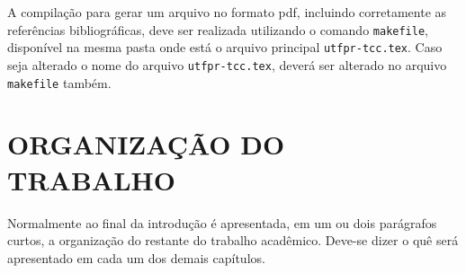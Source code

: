 A compilação para gerar um arquivo no formato pdf, incluindo corretamente as referências bibliográficas, deve ser realizada utilizando o comando \verb|makefile|, disponível na mesma pasta onde está o arquivo principal \verb|utfpr-tcc.tex|. Caso seja alterado o nome do arquivo \verb|utfpr-tcc.tex|, deverá ser alterado no arquivo \verb|makefile| também.

\section{ORGANIZAÇÃO DO TRABALHO}
\label{sec:organizacaoTrabalho}

Normalmente ao final da introdução é apresentada, em um ou dois parágrafos curtos, a organização do restante do trabalho acadêmico.
Deve-se dizer o quê será apresentado em cada um dos demais capítulos.

